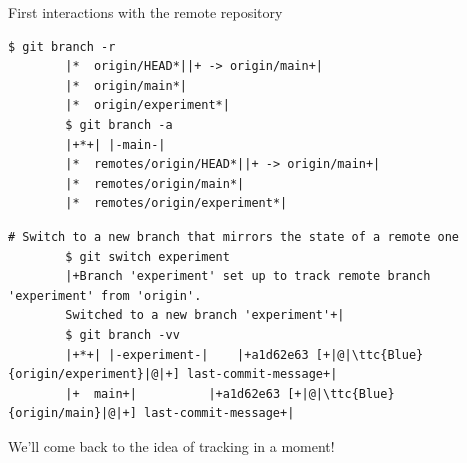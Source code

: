 \documentclass[usenames,svgnames,14pt]{beamer}
\newcommand{\ttc}[2]{\texttt{\textcolor{#1}{#2}}}%
\begin{document}
\begin{frame}[fragile]{First interactions with the remote repository}
    \begin{lstlisting}[style=MyBash]
        $ git branch -r
        |*  origin/HEAD*||+ -> origin/main+|
        |*  origin/main*|
        |*  origin/experiment*|
        $ git branch -a
        |+*+| |-main-|
        |*  remotes/origin/HEAD*||+ -> origin/main+|
        |*  remotes/origin/main*|
        |*  remotes/origin/experiment*|
    \end{lstlisting}
    \begin{lstlisting}[style=MyBash]
        # Switch to a new branch that mirrors the state of a remote one
        $ git switch experiment
        |+Branch 'experiment' set up to track remote branch 'experiment' from 'origin'.
        Switched to a new branch 'experiment'+|
        $ git branch -vv
        |+*+| |-experiment-|    |+a1d62e63 [+|@|\ttc{Blue}{origin/experiment}|@|+] last-commit-message+|
        |+  main+|          |+a1d62e63 [+|@|\ttc{Blue}{origin/main}|@|+] last-commit-message+|
    \end{lstlisting}
    \medskip
    \centerline{We'll come back to the idea of tracking in a moment!}
\end{frame}
\end{document}
